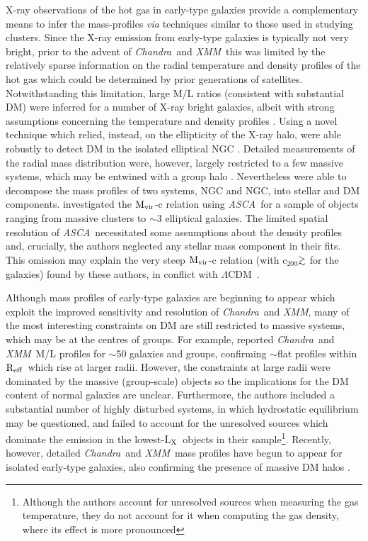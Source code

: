 \documentclass{emulateapj}
\def\spose#1{\hbox to 0pt{#1\hss}}
\def\gtsim{$\mathrel{\spose{\lower 3pt\hbox{$\sim$}} 
        \raise 2.0pt\hbox{$>$}}$\thinspace}
\def \eg {e.g.}
\newcommand{\mvir}{${\rm M_{vir}}$}
\newcommand{\reff}{${\rm R_{eff}}$}
\newcommand{\chandra }{{\em Chandra}}
\newcommand{\lcdm}{$\Lambda$CDM}
\newcommand{\xmm }{{\em XMM}}
\newcommand{\asca }{{\em ASCA}}
\newcommand{\lx }{${\rm L_X}$}
\newcommand{\thin}{\thinspace}
\begin{document}
X-ray observations of the hot gas in early-type galaxies provide a 
complementary means to infer the mass-profiles {\em via}
techniques similar to those used in studying clusters. 
Since the X-ray emission from early-type galaxies is typically
not very bright, prior to the 
advent of  \chandra\ and \xmm\ this was limited
by the relatively sparse information on the 
radial temperature and density profiles of the hot gas
which could be determined by prior generations of 
satellites.
Notwithstanding this limitation, large M/L ratios (consistent
with substantial DM) were 
inferred for a number of X-ray bright galaxies,
albeit with strong assumptions concerning the temperature and density
profiles \citep[\eg][]{forman85a,loewenstein99b}.
Using a novel technique which relied, instead, on the
ellipticity of the X-ray halo, \citet{buote94} were able robustly to 
detect DM  in the isolated elliptical
NGC\thin 720 \citep[see also][]{buote96a,buote98d,buote02b}. 
Detailed measurements of the radial mass distribution 
were, however, largely restricted
to a few massive systems, which may be entwined with a group
halo \citep[\eg][]{irwin96,brighenti97a}. 
Nevertheless \citet{brighenti97a}
were able to decompose the mass profiles of two systems, NGC\thin 4472
and NGC\thin 4649, into stellar and DM components.
\citet{sato00a} investigated the \mvir-c relation using \asca\ for a 
sample of objects ranging from massive clusters to $\sim$3 elliptical
galaxies. The limited spatial resolution of \asca\ necessitated
some assumptions about the density  profiles
and, crucially, the authors neglected any stellar mass component
in their fits. This omission may explain the very steep
\mvir-c relation (with c$_{200}$\gtsim 30 for the galaxies) found by
these authors, in conflict with \lcdm\ \citep{mamon05a}.

Although mass profiles of early-type galaxies are beginning to appear
which exploit the improved sensitivity and resolution of \chandra\ and \xmm,
many of the most interesting constraints on DM are still restricted to
massive systems, which may be at the centres of groups.
For example, \citet{fukazawa06a} reported \chandra\ and \xmm\ M/L profiles for 
$\sim$50 galaxies and groups,
confirming $\sim$flat profiles within \reff\ which rise at larger
radii. However, the constraints at large radii were dominated by
the massive (group-scale) objects so the implications for the DM
content of normal galaxies are unclear. Furthermore,
the authors  included a substantial number of 
highly disturbed systems, in which hydrostatic equilibrium
may be questioned, and failed to account for the unresolved
sources which dominate the emission in the lowest-\lx\ objects
in their sample\footnote{Although the authors account for unresolved
sources when measuring the gas temperature, they do not account for
it when computing the gas density, where its effect is more pronounced}.
Recently, however, detailed \chandra\ and \xmm\ mass profiles have begun to
appear for isolated early-type galaxies, also confirming the presence
of massive DM halos \citep[\eg][]{osullivan04b,khosroshahi04a}.
\end{document}
